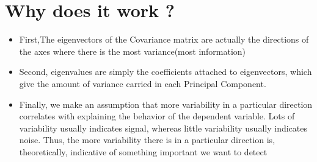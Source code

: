 \documentclass[a4paper, 11pt]{article}
\begin{document}
\section{Why does it work ?} 
\begin{itemize}
    \item First,The eigenvectors of the Covariance matrix are actually the directions of the axes where there is the most variance(most information)
    \item Second, eigenvalues are simply the coefficients attached to eigenvectors, which give the amount of variance carried in each Principal Component.
     \item Finally, we make an assumption that more variability in a particular direction correlates with explaining the behavior of the dependent variable.
     Lots of variability usually indicates signal, whereas little variability usually indicates noise. Thus, the more variability there is in a particular direction is,
      theoretically, indicative of something important we want to detect
\end{itemize}




\end{document}
